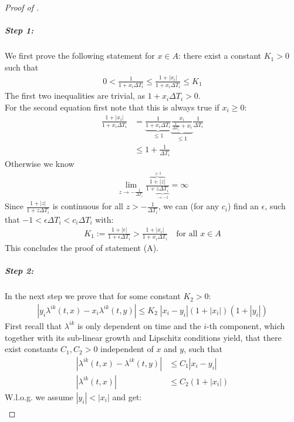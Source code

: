 \documentclass[12pt]{article}
\begin{document}
\begin{proof}[Proof of ]
		\subparagraph{Step 1:}
		We first prove the following statement for $ x \in A$: there exist a constant $K_1 > 0$ such that
		\begin{align*}
			0 < \frac{1}{1+ x_i\Delta T_i } \le \frac{1+|x_i|}{1+ x_i\Delta T_i } \le K_1 \tag{A}
		\end{align*}
		The first two inequalities are trivial, as $1 + x_i\Delta T_i > 0$.\\
		For the second equation first note that this is always true if $x_i \ge 0$:
		\begin{align*}
			\frac{1+|x_i|}{1+ x_i\Delta T_i } &= \underbrace{\frac{1}{1+ x_i\Delta T_i }}_{\le 1}  \underbrace{\frac{x_i}{\frac{1}{\Delta T_i}+ x_i }}_{\le 1}\frac{1}{\Delta T_i}\\
			&\le 1 + \frac{1}{\Delta T_i}
		\end{align*}
		Otherwise we know
		\begin{align*}
			\lim\limits_{z \rightarrow -\frac{1}{\Delta T_i}} \frac{\overbrace{1 + |z|}^{ \ge 1}}{1+ \underbrace{z\Delta T_i}_{\rightarrow -1}} = \infty
		\end{align*}
		Since $\frac{1+|z|}{1+ z\Delta T_i }$ is continuous for all $z > -\frac{1}{\Delta T_i}$, we can (for any $c_i$) find an $\epsilon$, such that $-1 < \epsilon\Delta T_i < c_i \Delta T_i$ with:
		\begin{align*}
			K_1:= \frac{1+|\epsilon|}{1+ \epsilon\Delta T_i } > \frac{1+|x_i|}{1+ x_i\Delta T_i } \quad \text{for all } x \in A
		\end{align*}
		This concludes the proof of statement (A).
		\subparagraph{Step 2:}
		In the next step we prove that for some constant $K_2 > 0$:
		\begin{align*}
			\left| y_i \lambda^{ik}(t, x) - x_i \lambda^{ik}(t,y) \right|\le K_2 \;\left| x_i - y_i \right| \left(1 + \left|x_i\right|\right)\left(1 + \left|y_i\right|\right) \tag{B}
		\end{align*}
		First recall that $\lambda^{i k}$ is only dependent on time and the $i$-th component, which together with its sub-linear growth and Lipschitz conditions yield, that there exist constants $C_1,C_2 > 0$ independent of $x$ and $y$, such that
		\begin{align*}
			\left|\lambda^{i k}(t,x)- \lambda^{i k}(t,y) \right| &\le C_1\left|x_i - y_i\right|\\
			\left|\lambda^{i k}(t,x) \right| &\le C_2\left(1 + \left|x_i\right|\right)
		\end{align*}
		W.l.o.g. we assume $|y_i| < |x_i|$ and get:
		\begin{align*}

\end{align*}
\end{proof}
\end{document}
